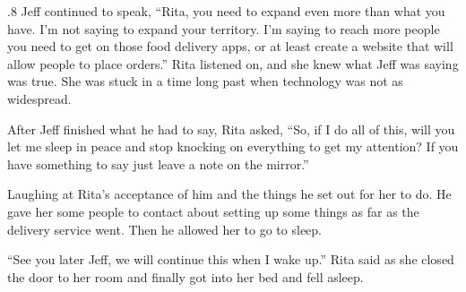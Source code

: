 \documentclass{article}
\begin{document}
\begin{tcolorbox}[colback=white, colframe=my-green, coltitle=black, parskip=5mm, title=
    \textbf{Human-written Story}, breakable]
\begin{spacing}{.8}
        Jeff continued to speak, “Rita, you need to expand even more than what you have. I’m not saying to expand your territory. I’m saying to reach more people you need to get on those food delivery apps, or at least create a website that will allow people to place orders.” Rita listened on, and she knew what Jeff was saying was true. She was stuck in a time long past when technology was not as widespread. \\\par
        After Jeff finished what he had to say, Rita asked, “So, if I do all of this, will you let me sleep in peace and stop knocking on everything to get my attention? If you have something to say just leave a note on the mirror.” \\\par
        Laughing at Rita’s acceptance of him and the things he set out for her to do. He gave her some people to contact about setting up some things as far as the delivery service went. Then he allowed her to go to sleep. \\\par
        “See you later Jeff, we will continue this when I wake up.” Rita said as she closed the door to her room and finally got into her bed and fell asleep. 
        \end{spacing}
\end{tcolorbox}
\end{document}
